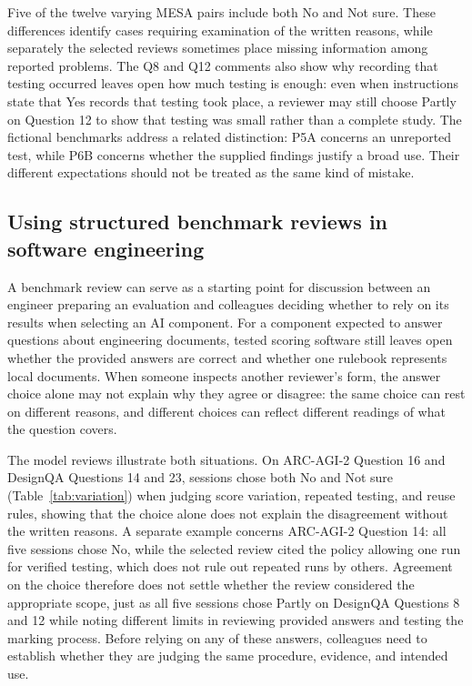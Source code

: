 \documentclass[10pt,conference]{IEEEtran}
\begin{document}
Five of the twelve varying MESA pairs include both No and Not sure. These differences identify cases requiring examination of the written reasons, while separately the selected reviews sometimes place missing information among reported problems. The Q8 and Q12 comments also show why recording that testing occurred leaves open how much testing is enough: even when instructions state that Yes records that testing took place, a reviewer may still choose Partly on Question 12 to show that testing was small rather than a complete study. The fictional benchmarks address a related distinction: P5A concerns an unreported test, while P6B concerns whether the supplied findings justify a broad use. Their different expectations should not be treated as the same kind of mistake.

\subsection{Using structured benchmark reviews in software engineering}
A benchmark review can serve as a starting point for discussion between an engineer preparing an evaluation and colleagues deciding whether to rely on its results when selecting an AI component. For a component expected to answer questions about engineering documents, tested scoring software still leaves open whether the provided answers are correct and whether one rulebook represents local documents. When someone inspects another reviewer's form, the answer choice alone may not explain why they agree or disagree: the same choice can rest on different reasons, and different choices can reflect different readings of what the question covers.

The model reviews illustrate both situations. On ARC-AGI-2 Question 16 and DesignQA Questions 14 and 23, sessions chose both No and Not sure (Table~\ref{tab:variation}) when judging score variation, repeated testing, and reuse rules, showing that the choice alone does not explain the disagreement without the written reasons. A separate example concerns ARC-AGI-2 Question 14: all five sessions chose No, while the selected review cited the policy allowing one run for verified testing, which does not rule out repeated runs by others. Agreement on the choice therefore does not settle whether the review considered the appropriate scope, just as all five sessions chose Partly on DesignQA Questions 8 and 12 while noting different limits in reviewing provided answers and testing the marking process. Before relying on any of these answers, colleagues need to establish whether they are judging the same procedure, evidence, and intended use.
\end{document}
